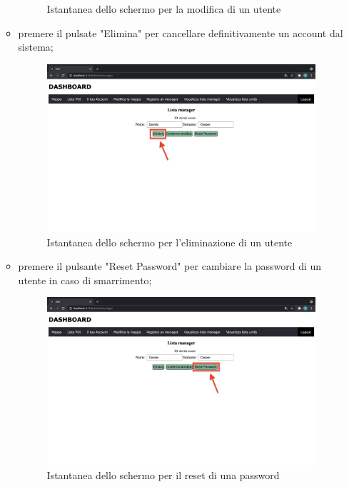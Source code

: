 \begin{itemize}
\begin{itemize}
\begin{figure}[H]
                \caption{Istantanea dello schermo per la modifica di un utente}
            \end{figure}
            \item premere il pulsate "Elimina" per cancellare definitivamente un account dal sistema;
            \begin{figure}[H]
                \centering
                \includegraphics[scale=0.12]{res/images/eliminamanager.png}
                \caption{Istantanea dello schermo per l'eliminazione di un utente}
            \end{figure}
            \item premere il pulsante "Reset Password" per cambiare la password di un utente in caso di smarrimento; 
            \begin{figure}[H]
                \centering
                \includegraphics[scale=0.12]{res/images/resetpassword1.png}
                \caption{Istantanea dello schermo per il reset di una password}

\end{figure}
\end{itemize}
\end{itemize}
